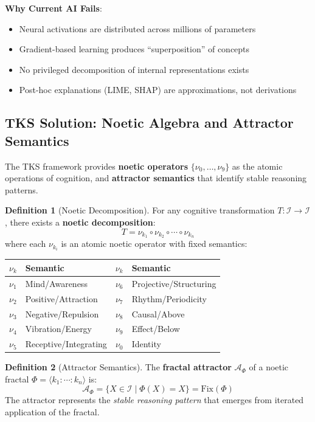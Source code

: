 \documentclass[11pt,twoside]{article}
\theoremstyle{definition}
\newtheorem{definition}{Definition}[section]
\theoremstyle{plain}
\theoremstyle{remark}
\newcommand{\Ideas}{\mathcal{I}}
\newcommand{\noe}[1]{\nu_{#1}}
\newcommand{\Frac}{\Phi}
\newcommand{\FractalAttractor}{\mathcal{A}_\Phi}
\begin{document}
\textbf{Why Current AI Fails}:
\begin{itemize}
  \item Neural activations are distributed across millions of parameters
  \item Gradient-based learning produces ``superposition'' of concepts
  \item No privileged decomposition of internal representations exists
  \item Post-hoc explanations (LIME, SHAP) are approximations, not derivations
\end{itemize}

\subsection{TKS Solution: Noetic Algebra and Attractor Semantics}

The TKS framework provides \textbf{noetic operators} $\{\noe{0}, \ldots, \noe{9}\}$
as the atomic operations of cognition, and \textbf{attractor semantics} that identify
stable reasoning patterns.

\begin{definition}[Noetic Decomposition]
\label{def:noetic-decomposition}
For any cognitive transformation $T : \Ideas \to \Ideas$, there exists a
\textbf{noetic decomposition}:
\[
T = \noe{k_1} \circ \noe{k_2} \circ \cdots \circ \noe{k_n}
\]
where each $\noe{k_i}$ is an atomic noetic operator with fixed semantics:
\begin{center}
\begin{tabular}{cl|cl}
\toprule
$\noe{k}$ & Semantic & $\noe{k}$ & Semantic \\
\midrule
$\noe{1}$ & Mind/Awareness & $\noe{6}$ & Projective/Structuring \\
$\noe{2}$ & Positive/Attraction & $\noe{7}$ & Rhythm/Periodicity \\
$\noe{3}$ & Negative/Repulsion & $\noe{8}$ & Causal/Above \\
$\noe{4}$ & Vibration/Energy & $\noe{9}$ & Effect/Below \\
$\noe{5}$ & Receptive/Integrating & $\noe{0}$ & Identity \\
\bottomrule
\end{tabular}
\end{center}
\end{definition}

\begin{definition}[Attractor Semantics]
\label{def:attractor-semantics}
The \textbf{fractal attractor} $\FractalAttractor$ of a noetic fractal
$\Frac = \langle k_1 : \cdots : k_n \rangle$ is:
\[
\FractalAttractor = \{X \in \Ideas \mid \Frac(X) = X\} = \mathrm{Fix}(\Frac)
\]
The attractor represents the \emph{stable reasoning pattern} that emerges from
iterated application of the fractal.
\end{definition}
\end{document}
